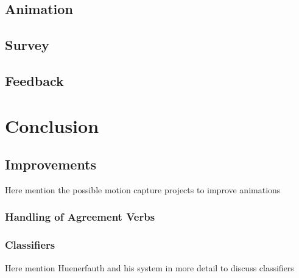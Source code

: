 \documentclass[12pt]{ociamthesis}  %
\begin{document}
\section{Animation}
\section{Survey}
\section{Feedback}



\chapter{Conclusion}

\section{Improvements}
	Here mention the possible motion capture projects to improve animations
	\subsection{Handling of Agreement Verbs}
	\subsection{Classifiers}
	Here mention Huenerfauth and his system in more detail to discuss classifiers 
\end{document}
